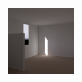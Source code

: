 \begin{figure}[t]
\newcommand{\figwidth}{0.155\textwidth}
\includegraphics[width=\figwidth]{p3r_PRE_N2_march_chris.png}

\end{figure}
